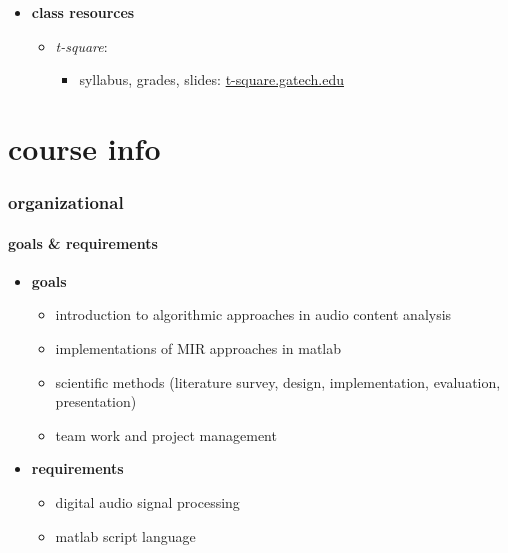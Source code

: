 \begin{frame}
\begin{itemize}
                \smallskip
                \item<3-> \textbf{class resources}
                    \begin{itemize}
                        \item	\textit{t-square}:
                            \begin{itemize}
                                \item   syllabus, grades, slides: \url{t-square.gatech.edu}
                            \end{itemize}
                    \end{itemize}
            \end{itemize}
        \end{frame}

    \section{course info}
        \begin{frame}\frametitle{organizational}\framesubtitle{goals \& requirements}
            \begin{itemize}
                \item	\textbf{goals}
                        \begin{itemize}
                            \item	introduction to algorithmic approaches in audio content analysis
                            \item	implementations of MIR approaches in matlab
                            \item	scientific methods (literature survey, design, implementation, evaluation, presentation)
                            \item	team work and project management
                        \end{itemize}

                \smallskip
                \item<2-> \textbf{requirements}	
                        \begin{itemize}
                            \item	digital audio signal processing
                            \item	matlab script language
                        \end{itemize}
            \end{itemize}
        \end{frame}

